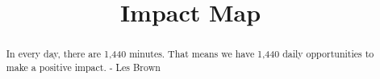 \documentclass{ximera}
\title{Impact Map}
\begin{document}
\begin{abstract}
In every day, there are 1,440 minutes. That means we have 1,440 daily opportunities to make a positive impact. - Les Brown
\end{abstract}
\maketitle
\end{document}
